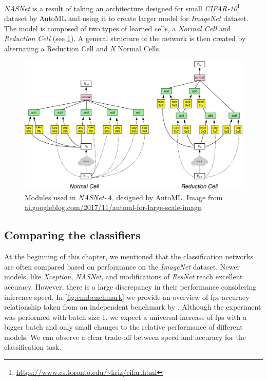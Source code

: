 \textit{NASNet} is a result of taking an architecture designed for small \textit{CIFAR-10}\footnote{\url{https://www.cs.toronto.edu/~kriz/cifar.html}} dataset by AutoML and using it to create larger model for \textit{ImageNet} dataset. The model is composed of two types of learned cells, a \textit{Normal Cell} and \textit{Reduction Cell} (see \cref{fig:nasnet}). A general structure of the network is then created by alternating a Reduction Cell and \textit{N} Normal Cells.

\begin{figure}
    \includegraphics[width=\textwidth]{img/nasnet}
    \caption[NASNet-A modules]
    {Modules used in \textit{NASNet-A}, designed by AutoML. Image from \url{ai.googleblog.com/2017/11/automl-for-large-scale-image}.}
    \label{fig:nasnet}
\end{figure}

\subsection{Comparing the classifiers}
\label{sec:cnncomp}
At the beginning of this chapter, we mentioned that the classification networks are often compared based on performance on the \textit{ImageNet} dataset. Newer models, like \textit{Xception}, \textit{NASNet}, and modifications of \textit{ResNet} reach excellent accuracy. However, there is a large discrepancy in their performance considering inference speed. In \cref{fig:cnnbenchmark} we provide an overview of fps-accuracy relationship taken from an independent benchmark by \citeauthor{bib:cnnbenchmark} \cite{bib:cnnbenchmark}. Although the experiment was performed with batch size 1, we expect a universal increase of fps with a bigger batch and only small changes to the relative performance of different models. We can observe a clear trade-off between speed and accuracy for the classification task.

